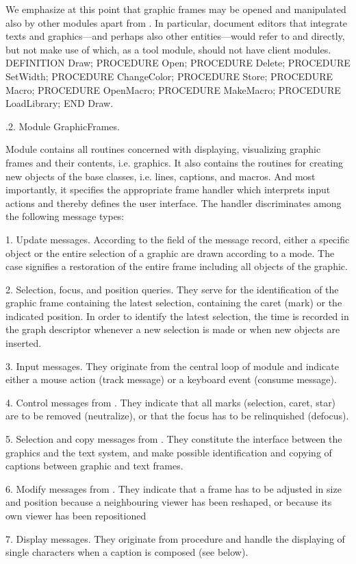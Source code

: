 We emphasize at this point that graphic frames may be opened and manipulated also by other modules apart from . In particular, document editors that integrate texts and graphics---and perhaps also other entities---would refer to  and  directly, but not make use of  which, as a tool module, should not have client modules.
\begintt
DEFINITION Draw;
  PROCEDURE Open;
  PROCEDURE Delete;
  PROCEDURE SetWidth;
  PROCEDURE ChangeColor;
  PROCEDURE Store;
  PROCEDURE Macro;
  PROCEDURE OpenMacro;
  PROCEDURE MakeMacro;
  PROCEDURE LoadLibrary;
END Draw.
\endtt

.2. Module GraphicFrames.

Module  contains all routines concerned with displaying, visualizing graphic frames and their contents, i.e. graphics. It also contains the routines for creating new objects of the base classes, i.e. lines, captions, and macros. And most importantly, it specifies the appropriate frame handler which interprets input actions and thereby defines the user interface. The handler discriminates among the following message types:

\item{1.} Update messages. According to the  field of the message record, either a specific object or the entire selection of a graphic are drawn according to a mode. The case  signifies a restoration of the entire frame including all objects of the graphic.
\item{2.} Selection, focus, and position queries. They serve for the identification of the graphic frame containing the latest selection, containing the caret (mark) or the indicated position. In order to identify the latest selection, the time is recorded in the graph descriptor whenever a new selection is made or when new objects are inserted.
\item{3.} Input messages. They originate from the central loop of module  and indicate either a mouse action (track message) or a keyboard event (consume message).
\item{4.} Control messages from . They indicate that all marks (selection, caret, star) are to be removed (neutralize), or that the focus has to be relinquished (defocus).
\item{5.} Selection and copy messages from . They constitute the interface between the graphics and the text system, and make possible identification and copying of captions between graphic and text frames.
\item{6.} Modify messages from . They indicate that a frame has to be adjusted in size and position because a neighbouring viewer has been reshaped, or because its own viewer has been repositioned
\item{7.} Display messages. They originate from procedure  and handle the displaying of single characters when a caption is composed (see below).

